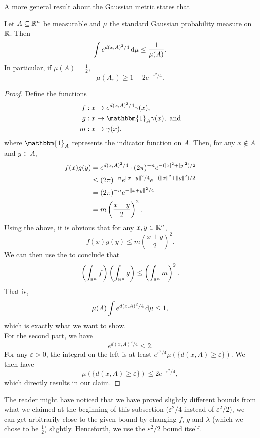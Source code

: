 A more general result about the Gaussian metric states that
\begin{ftheo}
Let $A\subseteq\mathbb{R}^n$ be measurable and $\mu$ the standard Gaussian probability measure on $\mathbb{R}$. Then
\[ \int e^{d(x,A)^2/4} \operatorname{d}\!{\mu} \leq \frac{1}{\mu(A)}. \]
In particular, if $\mu(A)=\frac{1}{2}$,
\[ \mu(A_\varepsilon) \geq 1 - 2e^{-\varepsilon^2/4}. \]
\end{ftheo}
\begin{proof}
Define the functions
\begin{align*}
    f &: x\mapsto e^{d(x,A)^2/4}\gamma(x), \\
    g &: x\mapsto \mathbbm{1}_A\gamma(x),\text{ and} \\
    m &: x\mapsto \gamma(x),
\end{align*}
where $\mathbbm{1}_A$ represents the indicator function on $A$. Then, for any $x\not\in A$ and $y\in A$,
\begin{align*}
    f(x)g(y) &= e^{d(x,A)^2/4}\cdot(2\pi)^{-n}e^{-(|x|^2+|y|^2)/2} \\
    &\leq  (2\pi)^{-n} e^{\left\lVert x-y\right\rVert^2/4} e^{-(\left\lVert x\right\rVert^2+\left\lVert y\right\rVert^2)/2} \\
    &= (2\pi)^{-n} e^{-\left\lVert x+y\right\rVert^2/4} \\
    &= m\left(\frac{x+y}{2}\right)^2.
\end{align*}
Using the above, it is obvious that for any $x,y\in\mathbb{R}^n$,
\[ f(x)g(y)\leq m\left(\frac{x+y}{2}\right)^2.\]
We can then use the  to conclude that
\[ \left(\int_{\mathbb{R}^n} f\right) \left(\int_{\mathbb{R}^n} g\right) \leq \left(\int_{\mathbb{R}^n} m\right)^2. \]
That is,
\[ \mu(A)\int e^{d(x,A)^2/4}\operatorname{d}\!{\mu} \leq 1,\]
which is exactly what we want to show.\\

For the second part, we have
\[ e^{d(x,A)^2/4} \leq 2. \]
For any $\varepsilon>0$, the integral on the left is at least $e^{\varepsilon^2/4}\mu(\{d(x,A) \geq \varepsilon\})$. We then have
\[ \mu(\{d(x,A) \geq \varepsilon\}) \leq 2e^{-\varepsilon^2/4}, \]
which directly results in our claim.
\end{proof}

The reader might have noticed that we have proved slightly different bounds from what we claimed at the beginning of this subsection ($\varepsilon^2/4$ instead of $\varepsilon^2/2$), we can get arbitrarily close to the given bound by changing $f$, $g$ and $\lambda$ (which we chose to be $\frac{1}{2}$) slightly. Henceforth, we use the $\varepsilon^2/2$ bound itself.

